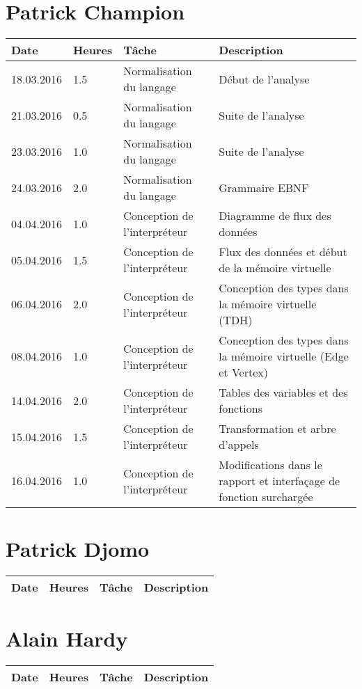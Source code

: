 \documentclass[french]{article}
\begin{document}
	\section*{Patrick Champion}
	\begin{tabular}{p{}|p{}|p{}|p{}}
		Date & Heures & Tâche & Description\\ \hline \hline
		18.03.2016 & 1.5 & Normalisation du langage & Début de l'analyse\\
		21.03.2016 & 0.5 & Normalisation du langage & Suite de l'analyse\\
		23.03.2016 & 1.0 & Normalisation du langage & Suite de l'analyse\\
		24.03.2016 & 2.0 & Normalisation du langage & Grammaire EBNF\\ \hline
		04.04.2016 & 1.0 & Conception de l'interpréteur & Diagramme de flux des données\\
		05.04.2016 & 1.5 & Conception de l'interpréteur & Flux des données et début de la mémoire virtuelle\\
		06.04.2016 & 2.0 & Conception de l'interpréteur & Conception des types dans la mémoire virtuelle (TDH)\\
		08.04.2016 & 1.0 & Conception de l'interpréteur & Conception des types dans la mémoire virtuelle (Edge et Vertex)\\
		14.04.2016 & 2.0 & Conception de l'interpréteur & Tables des variables et des fonctions\\
		15.04.2016 & 1.5 & Conception de l'interpréteur & Transformation et arbre d'appels\\
		16.04.2016 & 1.0 & Conception de l'interpréteur & Modifications dans le rapport et interfaçage de fonction surchargée\\
	\end{tabular}
	
	\section*{Patrick Djomo}
	\begin{tabular}{p{}|p{}|p{}|p{}}
		Date&Heures&Tâche&Description\\
		\hline
	\end{tabular}
	
	\section*{Alain Hardy}
	\begin{tabular}{p{}|p{}|p{}|p{}}
		Date&Heures&Tâche&Description\\
		\hline
	\end{tabular}
	
\end{document}
